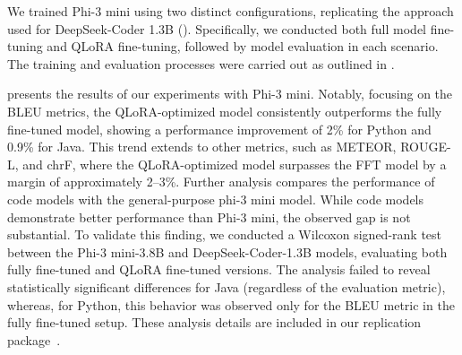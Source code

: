 
We trained Phi-3 mini using two distinct configurations, replicating the approach used for DeepSeek-Coder 1.3B (). Specifically, we conducted both full model fine-tuning and QLoRA fine-tuning, followed by model evaluation in each scenario. The training and evaluation processes were carried out as outlined in .

 presents the results of our experiments with Phi-3 mini. Notably, focusing on the BLEU metrics, the QLoRA-optimized model consistently outperforms the fully fine-tuned model, showing a performance improvement of 2\% for Python and 0.9\% for Java. This trend extends to other metrics, such as METEOR, ROUGE-L, and chrF, where the QLoRA-optimized model surpasses the FFT model by a margin of approximately 2–3\%.
Further analysis compares the performance of code models with the general-purpose phi-3 mini model. While code models demonstrate better performance than Phi-3 mini, the observed gap is not substantial. To validate this finding, we conducted a Wilcoxon signed-rank test between the Phi-3 mini-3.8B and DeepSeek-Coder-1.3B models, evaluating both fully fine-tuned and QLoRA fine-tuned versions.
The analysis failed to reveal statistically significant differences  for Java (regardless of the evaluation metric), whereas, for Python, this behavior was observed only for the BLEU metric in the fully fine-tuned setup. These analysis details are included in our replication package~\cite{replication}.
\vspace{5pt}

